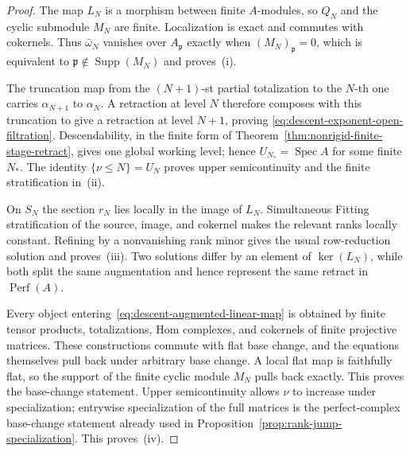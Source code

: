 \documentclass[11pt]{article}
\theoremstyle{definition}
\begin{document}
\begin{proof}
The map $L_N$ is a morphism between finite $A$-modules, so $Q_N$ and the cyclic
submodule $M_N$ are finite.  Localization is exact and commutes with cokernels.
Thus $\bar\omega_N$ vanishes over $A_{\mathfrak p}$ exactly when
$(M_N)_{\mathfrak p}=0$, which is equivalent to
$\mathfrak p\notin\operatorname{Supp}(M_N)$ and proves~(i).

The truncation map from the $(N+1)$-st partial totalization to the $N$-th one
carries $\alpha_{N+1}$ to $\alpha_N$.  A retraction at level $N$ therefore
composes with this truncation to give a retraction at level $N+1$, proving
\eqref{eq:descent-exponent-open-filtration}.  Descendability, in the finite
form of Theorem~\ref{thm:nonrigid-finite-stage-retract}, gives one global
working level; hence $U_{N_*}=\operatorname{Spec}A$ for some finite $N_*$.  The
identity $\{\nu\leq N\}=U_N$ proves upper semicontinuity and the finite
stratification in~(ii).

On $S_N$ the section $r_N$ lies locally in the image of $L_N$.  Simultaneous
Fitting stratification of the source, image, and cokernel makes the relevant
ranks locally constant.  Refining by a nonvanishing rank minor gives the
usual row-reduction solution and proves~(iii).  Two solutions differ by an
element of $\ker(L_N)$, while both split the same augmentation and hence
represent the same retract in $\operatorname{Perf}(A)$.

Every object entering~\eqref{eq:descent-augmented-linear-map} is obtained by
finite tensor products, totalizations, Hom complexes, and cokernels of finite
projective matrices.  These constructions commute with flat base change, and
the equations themselves pull back under arbitrary base change.  A local flat
map is faithfully flat, so the support of the finite cyclic module $M_N$ pulls
back exactly.  This proves the base-change statement.  Upper semicontinuity
allows $\nu$ to increase under specialization; entrywise specialization of the
full matrices is the perfect-complex base-change statement already used in
Proposition~\ref{prop:rank-jump-specialization}.  This proves~(iv).
\end{proof}
\end{document}
